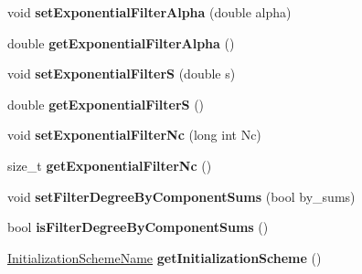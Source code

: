 \begin{DoxyCompactItemize}
\item 
\hypertarget{classnatrium_1_1SolverConfiguration_ac7a78062007bb0f3127f9b6325de7be6}{
void {\bfseries setExponentialFilterAlpha} (double alpha)}
\label{classnatrium_1_1SolverConfiguration_ac7a78062007bb0f3127f9b6325de7be6}

\item 
\hypertarget{classnatrium_1_1SolverConfiguration_a6bfd25f3fcc09328d00902c0ff2898d2}{
double {\bfseries getExponentialFilterAlpha} ()}
\label{classnatrium_1_1SolverConfiguration_a6bfd25f3fcc09328d00902c0ff2898d2}

\item 
\hypertarget{classnatrium_1_1SolverConfiguration_a94e94e7b9fff7e689db502f14fc17a4b}{
void {\bfseries setExponentialFilterS} (double s)}
\label{classnatrium_1_1SolverConfiguration_a94e94e7b9fff7e689db502f14fc17a4b}

\item 
\hypertarget{classnatrium_1_1SolverConfiguration_a2b98b8bd11588d0f7b4cd00d89e08294}{
double {\bfseries getExponentialFilterS} ()}
\label{classnatrium_1_1SolverConfiguration_a2b98b8bd11588d0f7b4cd00d89e08294}

\item 
\hypertarget{classnatrium_1_1SolverConfiguration_a9b5459c5abb60e225c635a1b2b7a4d36}{
void {\bfseries setExponentialFilterNc} (long int Nc)}
\label{classnatrium_1_1SolverConfiguration_a9b5459c5abb60e225c635a1b2b7a4d36}

\item 
\hypertarget{classnatrium_1_1SolverConfiguration_a2b494eac29a048b8a484f7047b40efce}{
size\_\-t {\bfseries getExponentialFilterNc} ()}
\label{classnatrium_1_1SolverConfiguration_a2b494eac29a048b8a484f7047b40efce}

\item 
\hypertarget{classnatrium_1_1SolverConfiguration_ae13406455655788dba00183fec9b4c97}{
void {\bfseries setFilterDegreeByComponentSums} (bool by\_\-sums)}
\label{classnatrium_1_1SolverConfiguration_ae13406455655788dba00183fec9b4c97}

\item 
\hypertarget{classnatrium_1_1SolverConfiguration_a0541ca015f1392389d1b3da0832f6b23}{
bool {\bfseries isFilterDegreeByComponentSums} ()}
\label{classnatrium_1_1SolverConfiguration_a0541ca015f1392389d1b3da0832f6b23}

\item 
\hypertarget{classnatrium_1_1SolverConfiguration_afe9fd2087df0ab6066f260bf6bfd03ac}{
\hyperlink{namespacenatrium_a5aad7d448441836f9c631c505cf8cd54}{InitializationSchemeName} {\bfseries getInitializationScheme} ()}
\label{classnatrium_1_1SolverConfiguration_afe9fd2087df0ab6066f260bf6bfd03ac}


\end{DoxyCompactItemize}
